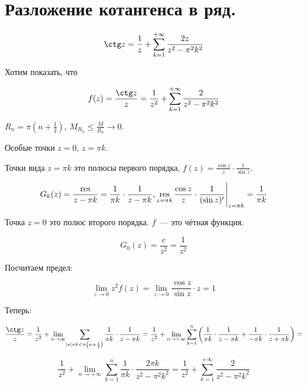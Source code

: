 \section{Разложение котангенса в ряд.}
\begin{example}
    \begin{gather*}
        \ctg z = \frac{1}{z} + \sum_{k=1}^{+\infty} \frac{2z}{z^2-\pi^2k^2}
    \end{gather*}
\end{example}

Хотим показать, что

\[
    f(z) = \frac{\ctg z}{z} = \frac{1}{z^2} +
    \sum\limits_{k=1}^{+\infty} \frac{2}{z^2-\pi^2k^2}
\]

$R_n = \pi\left(n + \frac12\right)$,
$M_{R_n} \le \frac{M}{R_n} \to 0$.

Особые точки $z = 0$, $z = \pi k$.

Точки вида $z = \pi k$ это полюсы первого порядка,
$f(z) = \frac{\cos z}{z} \cdot \frac{1}{\sin z}$.

\[
    G_k(z) = \frac{\res}{z-\pi k} = \frac{1}{\pi k}
    \cdot \frac{1}{z-\pi k}, \res\limits_{z=\pi k} \frac{\cos z}{z}
    \cdot \eval{\frac{1}{(\sin z)'}}_{z=\pi k} = \frac{1}{\pi k}
\]

Точка $z = 0$ это полюс второго порядка.
$f$~--- это чётная функция.

\[
    G_0(z) = \frac{c}{z^2} = \frac{1}{z^2}
\]

Посчитаем предел:

\[
    \lim_{z\to0} z^2f(z) = \lim_{z\to0} \frac{\cos z}{\sin z}\cdot z = 1
\]

Теперь:

\[
    \frac{\ctg z}{z}
    = \frac{1}{z^2}+\lim_{n\to\infty}
    \sum\limits_{\abs{\pi k} < \pi\left(n + \frac12\right)}
    \frac{1}{\pi k} \cdot \frac{1}{z-\pi k}
    = \frac{1}{z^2}
    + \lim\limits_{n \to +\infty} \sum\limits_{k=1}^n
    \left(\frac{1}{\pi k } \cdot \frac{1}{z - \pi k} + \frac{1}{-\pi k } \cdot \frac{1}{z + \pi k} \right)  =
\]

\[
    \frac{1}{z^2}
    + \lim\limits_{n \to +\infty} \sum\limits_{k=1}^n \frac{1}{\pi k} \cdot \frac{2 \pi k}{z ^ 2 - \pi ^ 2 k ^ 2}=
    \frac{1}{z^2} + \sum\limits_{k=1}^{+\infty} \frac{2}{z^2-\pi^2k^2}
\]
\newpage

